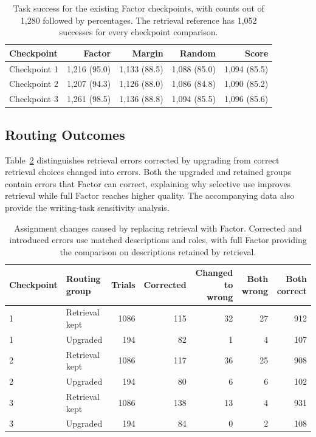 \documentclass[sigconf,nonacm,balance=false]{aamas}
\newcommand{\tabstyle}{\small\setlength{\tabcolsep}{3pt}\renewcommand{\arraystretch}{1.10}}
\begin{document}
\begin{table}[!htbp]
\centering\tabstyle
\caption{Task success for the existing Factor checkpoints, with counts out of 1,280 followed by percentages. The retrieval reference has 1,052 successes for every checkpoint comparison.}
\label{tab:selection-by-seed}
\begin{tabular}{@{}lrrrr@{}}
\toprule
\textbf{Checkpoint} & \textbf{Factor} & \textbf{Margin} & \textbf{Random} & \textbf{Score}\\
\midrule
Checkpoint 1 & 1,216 (95.0) & 1,133 (88.5) & 1,088 (85.0) & 1,094 (85.5)\\
Checkpoint 2 & 1,207 (94.3) & 1,126 (88.0) & 1,086 (84.8) & 1,090 (85.2)\\
Checkpoint 3 & 1,261 (98.5) & 1,136 (88.8) & 1,094 (85.5) & 1,096 (85.6)\\
\bottomrule
\end{tabular}
\end{table}

\subsection{Routing Outcomes}
Table~\ref{tab:selection-repair} distinguishes retrieval errors corrected by upgrading from correct retrieval choices changed into errors. Both the upgraded and retained groups contain errors that Factor can correct, explaining why selective use improves retrieval while full Factor reaches higher quality. The accompanying data also provide the writing-task sensitivity analysis.

\begin{table}[H]
\centering\tabstyle
\caption{Assignment changes caused by replacing retrieval with Factor. Corrected and introduced errors use matched descriptions and roles, with full Factor providing the comparison on descriptions retained by retrieval.}
\label{tab:selection-repair}
\begin{tabular}{@{}llrrrrr@{}}
\toprule
\textbf{Checkpoint} & \textbf{Routing group} & \textbf{Trials} & \textbf{Corrected} & \textbf{Changed to wrong} & \textbf{Both wrong} & \textbf{Both correct}\\
\midrule
1 & Retrieval kept & 1086 & 115 & 32 & 27 & 912\\
1 & Upgraded & 194 & 82 & 1 & 4 & 107\\
2 & Retrieval kept & 1086 & 117 & 36 & 25 & 908\\
2 & Upgraded & 194 & 80 & 6 & 6 & 102\\
3 & Retrieval kept & 1086 & 138 & 13 & 4 & 931\\
3 & Upgraded & 194 & 84 & 0 & 2 & 108\\
\bottomrule
\end{tabular}
\end{table}
\end{document}
